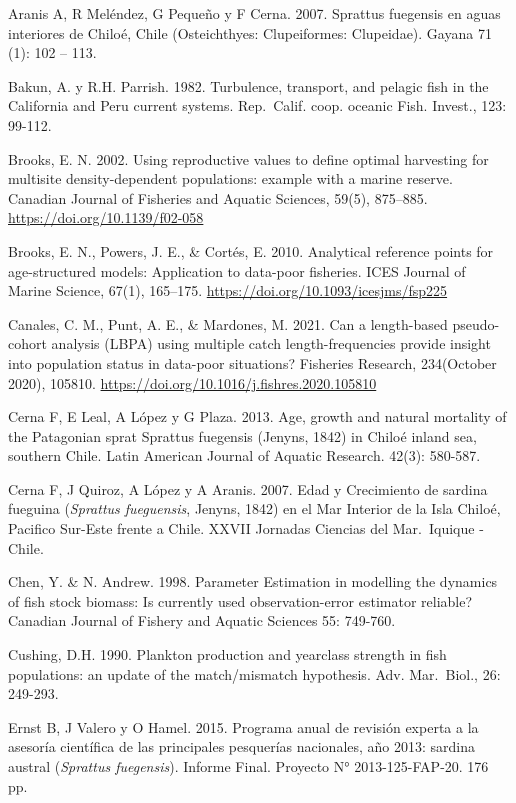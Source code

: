 \documentclass[
  spanish,
]{article}
\begin{document}
Aranis A, R Meléndez, G Pequeño y F Cerna. 2007. Sprattus fuegensis en
aguas interiores de Chiloé, Chile (Osteichthyes: Clupeiformes:
Clupeidae). Gayana 71 (1): 102 -- 113.

Bakun, A. y R.H. Parrish. 1982. Turbulence, transport, and pelagic fish
in the California and Peru current systems. Rep.~Calif. coop. oceanic
Fish. Invest., 123: 99-112.

Brooks, E. N. 2002. Using reproductive values to define optimal
harvesting for multisite density-dependent populations: example with a
marine reserve. Canadian Journal of Fisheries and Aquatic Sciences,
59(5), 875--885. \url{https://doi.org/10.1139/f02-058}

Brooks, E. N., Powers, J. E., \& Cortés, E. 2010. Analytical reference
points for age-structured models: Application to data-poor fisheries.
ICES Journal of Marine Science, 67(1), 165--175.
\url{https://doi.org/10.1093/icesjms/fsp225}

Canales, C. M., Punt, A. E., \& Mardones, M. 2021. Can a length-based
pseudo-cohort analysis (LBPA) using multiple catch length-frequencies
provide insight into population status in data-poor situations?
Fisheries Research, 234(October 2020), 105810.
\url{https://doi.org/10.1016/j.fishres.2020.105810}

Cerna F, E Leal, A López y G Plaza. 2013. Age, growth and natural
mortality of the Patagonian sprat Sprattus fuegensis (Jenyns, 1842) in
Chiloé inland sea, southern Chile. Latin American Journal of Aquatic
Research. 42(3): 580-587.

Cerna F, J Quiroz, A López y A Aranis. 2007. Edad y Crecimiento de
sardina fueguina (\emph{Sprattus fueguensis}, Jenyns, 1842) en el Mar
Interior de la Isla Chiloé, Pacifico Sur-Este frente a Chile. XXVII
Jornadas Ciencias del Mar.~Iquique - Chile.

Chen, Y. \& N. Andrew. 1998. Parameter Estimation in modelling the
dynamics of fish stock biomass: Is currently used observation-error
estimator reliable? Canadian Journal of Fishery and Aquatic Sciences 55:
749-760.

Cushing, D.H. 1990. Plankton production and yearclass strength in fish
populations: an update of the match/mismatch hypothesis. Adv.
Mar.~Biol., 26: 249-293.

Ernst B, J Valero y O Hamel. 2015. Programa anual de revisión experta a
la asesoría científica de las principales pesquerías nacionales, año
2013: sardina austral (\emph{Sprattus fuegensis}). Informe Final.
Proyecto N° 2013-125-FAP-20. 176 pp.
\end{document}
